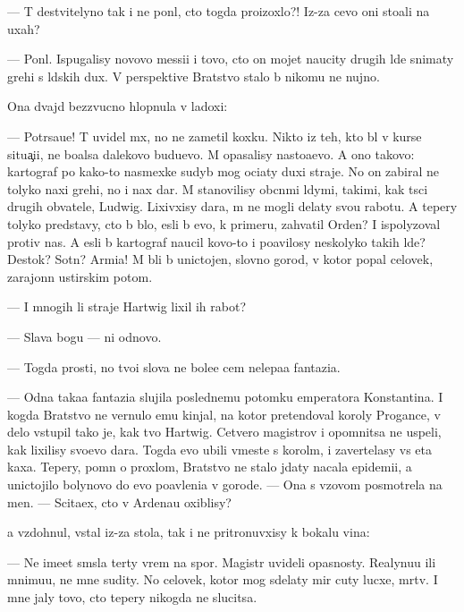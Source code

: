 \documentclass[10pt]{book}
\begin{document}
— T{\yi} de{\y}stvitelyno tak i ne pon{\ia}l, cto togda proizoxlo?! Iz-za cevo oni sto{\y}ali na uxah?

— Pon{\ia}l. Ispugalisy novovo messi{\y}i i tovo, cto on mojet naucity drugih l{\io}de{\y} snimaty grehi s l{\io}dskih dux. V perspektive Bratstvo stalo b{\yi} nikomu ne nujno.

Ona dvajd{\yi} bezzvucno hlopnula v ladoxi:

— Potr{\ia}sa{\y}u{\x}e! T{\yi} uvidel m{\yi}x, no ne zametil koxku. Nikto iz teh, kto b{\yi}l v kurse situa{\c}i{\y}i, ne bo{\y}alsa dalekovo budu{\x}evo. M{\yi} opasalisy nasto{\y}a{\x}evo. A ono takovo: kartograf po kako{\y}-to nasmexke sudyb{\yi} mog oci{\x}aty duxi straje{\y}. No on zabiral ne tolyko naxi grehi, no i nax dar. M{\yi} stanovilisy ob{\yi}cn{\yi}mi l{\io}dymi, takimi, kak t{\yi}s{\ia}ci drugih ob{\yi}vatele{\y}, Ludwig. Lixivxisy dara, m{\yi} ne mogli delaty svo{\y}u rabotu. A tepery tolyko predstavy, cto b{\yi} b{\yi}lo, {\y}esli b{\yi} {\y}evo, k primeru, zahvatil Orden? I ispolyzoval protiv nas. A {\y}esli b{\yi} kartograf naucil kovo-to i po{\y}avilosy neskolyko takih l{\io}de{\y}? Des{\ia}tok? Sotn{\ia}? Armi{\y}a! M{\yi} b{\yi}li b{\yi} uni\-cto\-jen{\yi}, slovno gorod, v kotor{\yi}{\y} popal celovek, zarajonn{\yi}{\y} {\y}ustirskim potom.

— I mnogih li straje{\y} Hartwig lixil ih rabot{\yi}?

— Slava bogu — ni odnovo.

— Togda prosti, no tvo{\y}i slova ne bole{\y}e cem nelepa{\y}a fantazi{\y}a.

— Odna taka{\y}a fantazi{\y}a slujila poslednemu potomku emperatora Konstantina. I kogda Bratstvo ne vernulo {\y}emu kinjal, na kotor{\yi}{\y} pretendoval koroly Progance, v delo vstupil tako{\y} je, kak tvo{\y} Hartwig. Cetvero magistrov i opomnitsa ne uspeli, kak lixilisy svo{\y}evo dara. Togda {\y}evo ubili vmeste s korol{\e}m, i zavertelasy vs{\ia} eta kaxa. Tepery, pomn{\ia} o proxlom, Bratstvo ne stalo jdaty nacala epidemi{\y}i, a unictojilo bolynovo do {\y}evo po{\y}avleni{\y}a v gorode. — Ona s v{\yi}zovom posmotrela na men{\ia}. — Scita{\y}ex, cto v Ardenau oxiblisy?

{\Y}a vzdohnul, vstal iz-za stola, tak i ne pritronuvxisy k bokalu vina:

— Ne ime{\y}et sm{\yi}sla ter{\ia}ty vrem{\ia} na spor{\yi}. Magistr{\yi} uvideli opasnosty. Realy\-nu\-{\y}u ili mnimu{\y}u, ne mne sudity. No celovek, kotor{\yi}{\y} mog sdelaty mir cuty lucxe, m{\e}rtv. I mne jaly tovo, cto tepery nikogda ne slucitsa.
\end{document}
